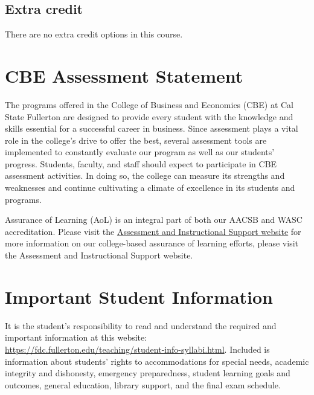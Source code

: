 \documentclass{./../Latex/syllabus}
\begin{document}
\subsection*{Extra credit}

There are no extra credit options in this course. 

\section*{CBE Assessment Statement}
The programs offered in the College of Business and Economics (CBE) at Cal State Fullerton are designed to provide every student with the knowledge and skills essential for a successful career in business. Since assessment plays a vital role in the college's drive to offer the best, several assessment tools are implemented to constantly evaluate our program as well as our students' progress. Students, faculty, and staff should expect to participate in CBE assessment activities. In doing so, the college can measure its strengths and weaknesses and continue cultivating a climate of excellence in its students and programs.

Assurance of Learning (AoL) is an integral part of both our AACSB and WASC accreditation. Please visit the \href{https://business.fullerton.edu/assessment}{Assessment and Instructional Support website} for more information on our college-based assurance of learning efforts, please visit the Assessment and Instructional Support website.

\section*{Important Student Information}
It is the student's responsibility to read and understand the required and important information at this website: \href{https://fdc.fullerton.edu/teaching/student-info-syllabi.html}{https://fdc.fullerton.edu/teaching/student-info-syllabi.html}. Included is information about students' rights to accommodations for special needs, academic integrity and dishonesty, emergency preparedness, student learning goals and outcomes, general education, library support, and the final exam schedule.


\end{document}
